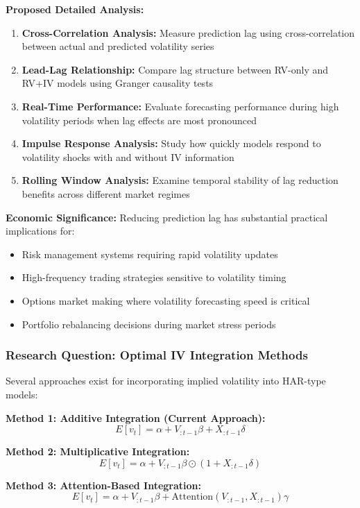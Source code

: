\documentclass[12pt,a4paper]{article}
\begin{document}
\textbf{Proposed Detailed Analysis:}
\begin{enumerate}
\item \textbf{Cross-Correlation Analysis:} Measure prediction lag using cross-correlation between actual and predicted volatility series
\item \textbf{Lead-Lag Relationship:} Compare lag structure between RV-only and RV+IV models using Granger causality tests
\item \textbf{Real-Time Performance:} Evaluate forecasting performance during high volatility periods when lag effects are most pronounced
\item \textbf{Impulse Response Analysis:} Study how quickly models respond to volatility shocks with and without IV information
\item \textbf{Rolling Window Analysis:} Examine temporal stability of lag reduction benefits across different market regimes
\end{enumerate}

\textbf{Economic Significance:} Reducing prediction lag has substantial practical implications for:
\begin{itemize}
\item Risk management systems requiring rapid volatility updates
\item High-frequency trading strategies sensitive to volatility timing
\item Options market making where volatility forecasting speed is critical
\item Portfolio rebalancing decisions during market stress periods
\end{itemize}

\subsubsection{Research Question: Optimal IV Integration Methods}

Several approaches exist for incorporating implied volatility into HAR-type models:

\textbf{Method 1: Additive Integration (Current Approach):}
$$E[v_t] = \alpha + V_{:t-1}\beta + X_{:t-1}\delta$$

\textbf{Method 2: Multiplicative Integration:}
$$E[v_t] = \alpha + V_{:t-1}\beta \odot (1 + X_{:t-1}\delta)$$

\textbf{Method 3: Attention-Based Integration:}
$$E[v_t] = \alpha + V_{:t-1}\beta + \text{Attention}(V_{:t-1}, X_{:t-1})\gamma$$
\end{document}
